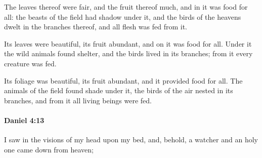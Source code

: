 			\begin{versebox}
					\item[BHS] 
					\item[LXX] 
					\item[ASV] The leaves thereof were fair, and the fruit thereof much, and in it was food for all: the beasts of the field had shadow under it, and the birds of the heavens dwelt in the branches thereof, and all flesh was fed from it.
					\item[NIV] Its leaves were beautiful, its fruit abundant, and on it was food for all. Under it the wild animals found shelter, and the birds lived in its branches; from it every creature was fed.
					\item[NRSV] Its foliage was beautiful, its fruit abundant, and it provided food for all. The animals of the field found shade under it, the birds of the air nested in its branches, and from it all living beings were fed.
			\end{versebox}

		\paragraph{Daniel 4:13} %
			\label{DANIEL-4-13}

			I saw in the visions of my head upon my bed, and, behold, a watcher and an holy one came down from heaven;

